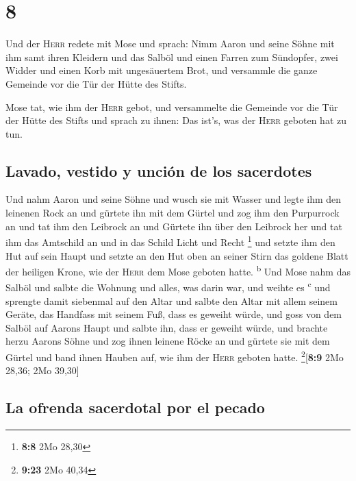 \hypertarget{section-7}{%
\section{8}\label{section-7}}

 Und der \textsc{Herr} redete mit Mose und sprach:
 Nimm Aaron und seine Söhne mit ihm samt ihren Kleidern
und das Salböl und einen Farren zum Sündopfer, zwei Widder und einen
Korb mit ungesäuertem Brot,  und versammle die ganze
Gemeinde vor die Tür der Hütte des Stifts.

 Mose tat, wie ihm der \textsc{Herr} gebot, und
versammelte die Gemeinde vor die Tür der Hütte des Stifts 
und sprach zu ihnen: Das ist's, was der \textsc{Herr} geboten hat zu
tun.

\hypertarget{lavado-vestido-y-unciuxf3n-de-los-sacerdotes}{%
\subsection{Lavado, vestido y unción de los
sacerdotes}\label{lavado-vestido-y-unciuxf3n-de-los-sacerdotes}}

 Und nahm Aaron und seine Söhne und wusch sie mit Wasser
 und legte ihm den leinenen Rock an und gürtete ihn mit
dem Gürtel und zog ihm den Purpurrock an und tat ihm den Leibrock an und
Gürtete ihn über den Leibrock her  und tat ihm das
Amtschild an und in das Schild Licht und Recht \footnote{\textbf{8:8}
  2Mo 28,30}  und setzte ihm den Hut auf sein Haupt und
setzte an den Hut oben an seiner Stirn das goldene Blatt der heiligen
Krone, wie der \textsc{Herr} dem Mose geboten hatte. \textsuperscript{b}
 Und Mose nahm das Salböl und salbte die Wohnung und
alles, was darin war, und weihte es \textsuperscript{c} 
und sprengte damit siebenmal auf den Altar und salbte den Altar mit
allem seinem Geräte, das Handfass mit seinem Fuß, dass es geweiht würde,
 und goss von dem Salböl auf Aarons Haupt und salbte ihn,
dass er geweiht würde,  und brachte herzu Aarons Söhne
und zog ihnen leinene Röcke an und gürtete sie mit dem Gürtel und band
ihnen Hauben auf, wie ihm der \textsc{Herr} geboten hatte.
\footnote{\textbf{9:23} 2Mo 40,34}{[}\textbf{8:9} 2Mo 28,36; 2Mo
39,30{]}

\hypertarget{la-ofrenda-sacerdotal-por-el-pecado}{%
\subsection{La ofrenda sacerdotal por el
pecado}\label{la-ofrenda-sacerdotal-por-el-pecado}}

